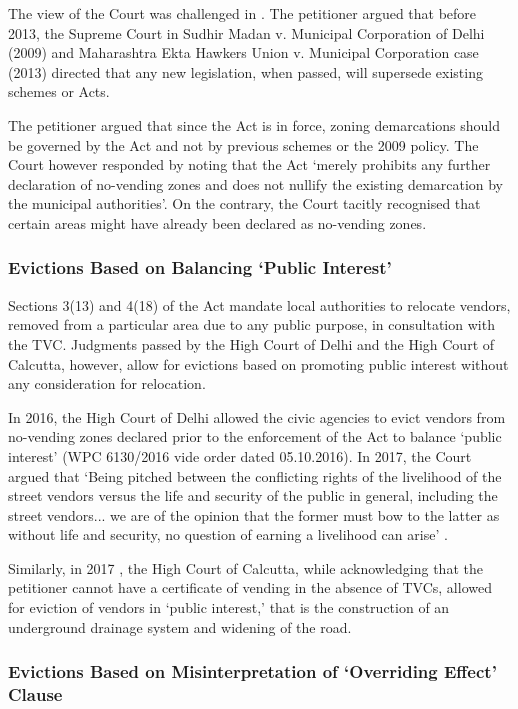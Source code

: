 \documentclass[a4paper, 12pt, twoside]{article}
\begin{document}
{The view of the Court was challenged in \cite{VKMMP}. The petitioner argued that before 2013, the Supreme Court in Sudhir Madan v. Municipal Corporation of Delhi (2009) and Maharashtra Ekta Hawkers Union v. Municipal Corporation case (2013) directed that any new legislation, when passed, will supersede existing schemes or Acts. 

The petitioner argued that since the Act is in force, zoning demarcations should be governed by the Act and not by previous schemes or the 2009 policy. The Court however responded by noting that the Act `merely prohibits any further declaration of no-vending zones and does not nullify the existing demarcation by the municipal authorities'. On the contrary, the Court tacitly recognised that certain areas might have already been declared as no-vending zones. 

\subsubsection*{Evictions Based on Balancing `Public Interest'}

Sections 3(13) and 4(18) of the Act mandate local authorities to relocate vendors, removed from a particular area due to any public purpose, in consultation with the TVC. Judgments passed by the High Court of Delhi and the High Court of Calcutta, however, allow for evictions based on promoting public interest without any consideration for relocation.

In 2016, the High Court of Delhi allowed the civic agencies to evict vendors from no-vending zones declared prior to the enforcement of the Act to balance `public interest' (WPC 6130/2016 vide order dated 05.10.2016). In 2017, the Court argued that `Being pitched between the conflicting rights of the livelihood of the street vendors versus the life and security of the public in general, including the street vendors... we are of the opinion that the former must bow to the latter as without life and security, no question of earning a livelihood can arise' \parencite{VKMMP}.

Similarly, in 2017 \parencite{GopalS}, the High Court of Calcutta, while acknowledging that the petitioner cannot have a certificate of vending in the absence of TVCs, allowed for eviction of vendors in `public interest,' that is the construction of an underground drainage system and widening of the road. 

\subsubsection*{Evictions Based on Misinterpretation of `Overriding Effect' Clause}

}
\end{document}
